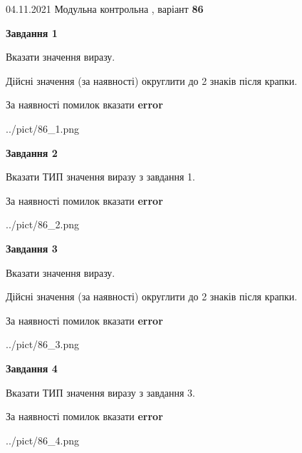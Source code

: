 \documentclass[11pt, ukrainian]{article}
\begin{document}
{04.11.2021 Модульна контрольна , варіант  \No \textbf { 86 }\par}
{
\begin {large}
{\begin {center}\textbf{Завдання 1}\end {center}}\par
Вказати значення виразу. \par
Дійсні значення (за наявності) округлити до 2 знаків після крапки. \par
За наявності помилок вказати \textbf{error}

\begin{center}
	{../pict/86_1.png}
\end{center}
\newpage

{\begin {center}\textbf{Завдання 2}\end {center}}\par
Вказати ТИП значення виразу з завдання 1. \par
За наявності помилок вказати \textbf{error}

\begin{center}
	{../pict/86_2.png}
\end{center}
\newpage

{\begin {center}\textbf{Завдання 3}\end {center}}\par
Вказати значення виразу. \par
Дійсні значення (за наявності) округлити до 2 знаків після крапки. \par
За наявності помилок вказати \textbf{error}

\begin{center}
	{../pict/86_3.png}
\end{center}
\newpage

{\begin {center}\textbf{Завдання 4}\end {center}}\par
Вказати ТИП значення виразу з завдання 3. \par
За наявності помилок вказати \textbf{error}

\begin{center}
	{../pict/86_4.png}
\end{center}
\newpage


\end{large}}
\end{document}
